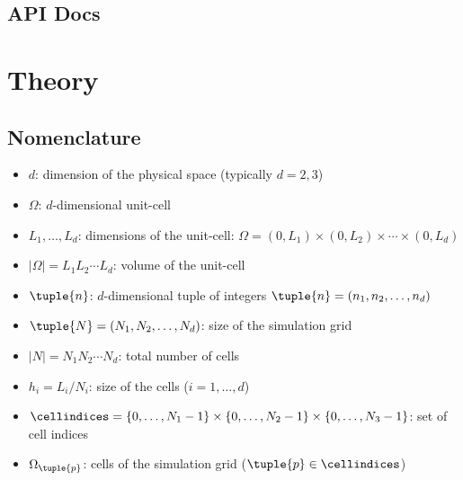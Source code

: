 \documentclass[oneside]{memoir}
\begin{document}
\hypertarget{15255107809304980587}{}


\chapter{API Docs}




\part{Theory}


\hypertarget{12321510312768487985}{}


\chapter{Nomenclature}



\begin{itemize}
\item \(d\): dimension of the physical space (typically \(d=2, 3\))


\item \(\Omega\): \(d\)-dimensional unit-cell


\item \(L_1,\ldots, L_d\): dimensions of the unit-cell: \(\Omega=(0, L_1)\times(0, L_2)\times\cdots\times(0, L_d)\)


\item \(\lvert\Omega\rvert=L_1L_2\cdots L_d\): volume of the unit-cell


\item \(\tuple{n}\): \(d\)-dimensional tuple of integers \(\tuple{n}=(n_1, n_2, \ldots, n_d)\)


\item \(\tuple{N}=(N_1, N_2, \ldots, N_d)\): size of the simulation grid


\item \(\lvert N\rvert=N_1N_2\cdots N_d\): total number of cells


\item \(h_i=L_i/N_i\): size of the cells (\(i=1, \ldots, d\))


\item \(\cellindices=\{0, \ldots, N_1-1\}\times\{0, \ldots, N_2-1\}\times\{0, \ldots, N_3-1\}\): set of cell indices


\item \(\Omega_{\tuple{p}}\): cells of the simulation grid (\(\tuple{p}\in\cellindices\))

\end{itemize}
\end{document}
